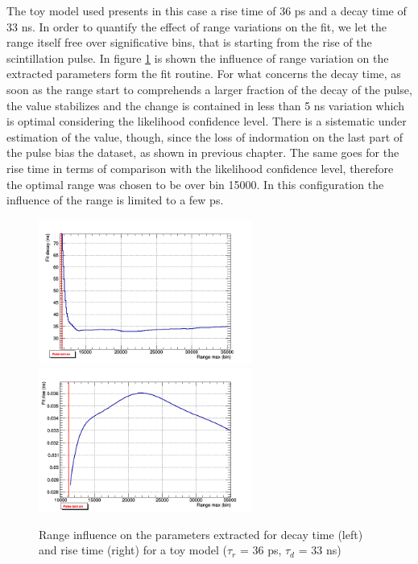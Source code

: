 The toy model used presents in this case a rise time of 36 ps and a decay time of 33 ns. 
In order to quantify the effect of range variations on the fit, we let the range itself free over significative bins, that is starting from the rise of the scintillation pulse.
In figure \ref{fig:range} is shown the influence of range variation on the extracted parameters form the fit routine.
For what concerns the decay time, as soon as the range start to comprehends a larger fraction of the decay of the pulse, the value stabilizes and the change is contained in less than 5 ns variation which is optimal considering the likelihood confidence level. There is a sistematic under estimation of the value, though, since the loss of indormation on the last part of the pulse bias the dataset, as shown in previous chapter.
The same goes for the rise time in terms of comparison with the likelihood confidence level, therefore the optimal range was chosen to be over bin 15000. In this configuration the influence of the range is limited to a few ps.
\begin{figure}[htbp]
\begin{center}
\includegraphics[width=7cm]{../Pictures/Chapter_7/decay_range_2.png}
\includegraphics[width=7cm]{../Pictures/Chapter_7/rise_range_2.png}
\end{center}
\caption[Range influence on toy model parameters]{Range influence on the parameters extracted for decay time (left) and rise time (right) for a toy model ($\tau _{r}$ = 36 ps, $\tau _{d}$ = 33 ns)}
\label{fig:range}
\end{figure}

